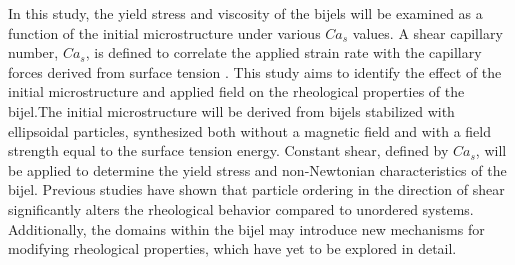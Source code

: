
In this study, the yield stress and viscosity of the bijels will be examined as a function of the initial microstructure under various $Ca_s$ values. 
A shear capillary number, $Ca_s$, is defined to correlate the applied strain rate with the capillary forces derived from surface tension 
\cite{frijters_effects_2012, yang_capillary_2022}. This study aims to identify the effect 
of the initial microstructure and applied field on the rheological properties of the bijel.The initial microstructure will be 
derived from bijels stabilized with ellipsoidal particles, synthesized both without a magnetic field and with a field 
strength equal to the surface tension energy. Constant shear, defined by $Ca_s$, will be applied to determine the yield stress and non-Newtonian 
characteristics of the bijel. Previous studies have shown that particle ordering in the direction of shear significantly alters the rheological behavior 
compared to unordered systems. Additionally, the domains within the bijel may introduce new mechanisms for modifying rheological properties, which have 
yet to be explored in detail.

